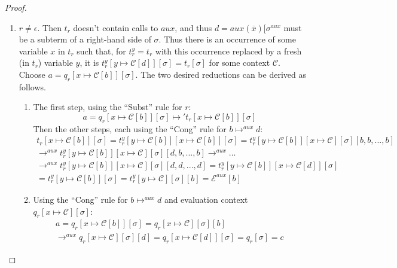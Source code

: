 \begin{lemma}
\begin{proof}
\begin{enumerate}
\item $r \neq \epsilon$. Then $t_r$ doesn't contain calls to $aux$, and thus $d = aux(\overline{x})[\sigma^{aux}$ must be a subterm of a right-hand side of $\sigma$. Thus there is an occurrence of some variable $x$ in $t_r$ such that, for $t^y_r = t_r$ with this occurrence replaced by a fresh (in $t_r$) variable $y$, it is $t^y_r[y \mapsto \mathcal{C}[d]][\sigma] = t_r[\sigma]$ for some context $\mathcal{C}$. Choose $a = q_r[x \mapsto \mathcal{C}[b]][\sigma]$. The two desired reductions can be derived as follows.
\begin{enumerate}
\item The first step, using the ``Subst'' rule for $r$:
\[
a = q_r[x \mapsto \mathcal{C}[b]][\sigma] \mapsto' t_r[x \mapsto \mathcal{C}[b]][\sigma]
\]
Then the other steps, each using the ``Cong'' rule for $b \mapsto^{aux} d$:
\begin{multline*}
t_r[x \mapsto \mathcal{C}[b]][\sigma] = t^y_r[y \mapsto \mathcal{C}[b]][x \mapsto \mathcal{C}[b]][\sigma] = t^y_r[y \mapsto \mathcal{C}[b]][x \mapsto \mathcal{C}][\sigma][b, b, ..., b] \\
\longrightarrow^{aux} t^y_r[y \mapsto \mathcal{C}[b]][x \mapsto \mathcal{C}][\sigma][d, b, ..., b] \longrightarrow^{aux} ... \\
\longrightarrow^{aux} t^y_r[y \mapsto \mathcal{C}[b]][x \mapsto \mathcal{C}][\sigma][d, d, ..., d] = t^y_r[y \mapsto \mathcal{C}[b]][x \mapsto \mathcal{C}[d]][\sigma] \\
= t^y_r[y \mapsto \mathcal{C}[b]][\sigma] = t^y_r[y \mapsto \mathcal{C}][\sigma][b] = \mathcal{E}^{aux}[b]
\end{multline*}

\item Using the ``Cong'' rule for $b \mapsto^{aux} d$ and evaluation context $q_r[x \mapsto \mathcal{C}][\sigma]$:
\begin{multline*}
a = q_r[x \mapsto \mathcal{C}[b]][\sigma] = q_r[x \mapsto \mathcal{C}][\sigma][b] \\ \longrightarrow^{aux} q_r[x \mapsto \mathcal{C}][\sigma][d] = q_r[x \mapsto \mathcal{C}[d]][\sigma] = q_r[\sigma] = c
\end{multline*}
\end{enumerate}
\end{enumerate}
\end{proof}
\end{lemma}

